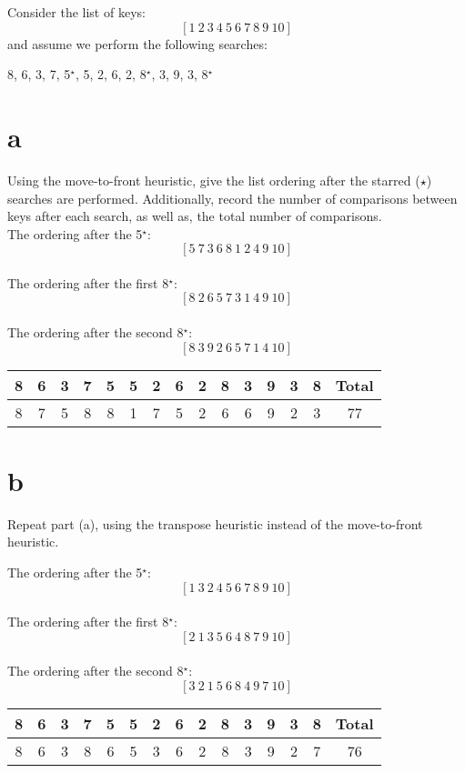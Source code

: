 \documentclass[12pt]{article}
\begin{document}
	Consider the list of keys:
	\[
	[1\ 2\ 3\ 4\ 5\ 6\ 7\ 8\ 9\ 10]
	\]
	and assume we perform the following searches:
	\begin{center}
		8, 6, 3, 7, 5$^\star$, 5, 2, 6, 2, 8$^\star$, 3, 9, 3, 8$^\star$ 
	\end{center}
	\begin{enumerate}
		\part{a} Using the move-to-front heuristic, give the list ordering after the starred ($\star$) searches are performed. 
		Additionally, record the number of comparisons between keys after each search, as well as, the total number of comparisons.\\
		The ordering after the 5$^\star$:
		\[
		[5\ 7\ 3\ 6\ 8\ 1\ 2\ 4\ 9\ 10]
		\]\\
		The ordering after the first 8$^\star$:
		\[
		[8\ 2\ 6\ 5\ 7\ 3\ 1\ 4\ 9\ 10]
		\]\\
		The ordering after the second 8$^\star$:
		\[
		[8\ 3\ 9\ 2\ 6\ 5\ 7\ 1\ 4\ 10]
		\]
		\begin{center}
			\begin{tabular}{|c|c|c|c|c|c|c|c|c|c|c|c|c|c||c|} \hline
				8 &  6 &  3 &  7 &  5 & 5 & 2 & 6 & 2 & 8 & 3 & 9 & 3 & 8  & Total \\ \hline
				8 & 7 & 5 & 8 & 8 & 1 & 7 & 5 & 2 & 6 & 6 & 9 & 2 & 3 & 77\\ \hline
			\end{tabular}
		\end{center}
		
		\part{b} Repeat part (a), using the transpose heuristic instead of the move-to-front heuristic.
		
		The ordering after the 5$^\star$:
		\[
		[1\ 3\ 2\ 4\ 5\ 6\ 7\ 8\ 9\ 10]
		\]\\
		The ordering after the first 8$^\star$:
		\[
		[2\ 1\ 3\ 5\ 6\ 4\ 8\ 7\ 9\ 10]
		\]\\
		The ordering after the second 8$^\star$:
		\[
		[3\ 2\ 1\ 5\ 6\ 8\ 4\ 9\ 7\ 10]
		\]
		\begin{center}
			\begin{tabular}{|c|c|c|c|c|c|c|c|c|c|c|c|c|c||c|} \hline
				8 &  6 &  3 &  7 &  5 & 5 & 2 & 6 & 2 & 8 & 3 & 9 & 3 & 8  & Total \\ \hline
				8 & 6 & 3 & 8 & 6 & 5 & 3 & 6 & 2 & 8 & 3 & 9 & 2 & 7 & 76\\ \hline
			\end{tabular}
		\end{center}
		

\end{enumerate}
\end{document}
